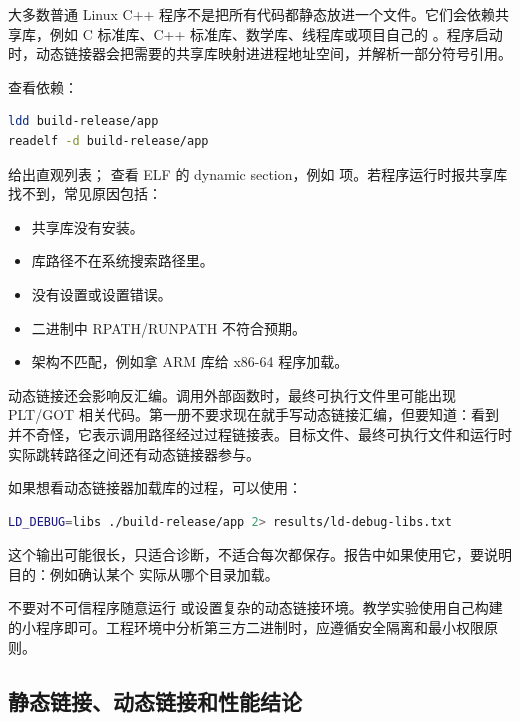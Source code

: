 大多数普通 Linux C++ 程序不是把所有代码都静态放进一个文件。它们会依赖共享库，例如 C 标准库、C++ 标准库、数学库、线程库或项目自己的 。程序启动时，动态链接器会把需要的共享库映射进进程地址空间，并解析一部分符号引用。

查看依赖：

\begin{lstlisting}[language=bash]
ldd build-release/app
readelf -d build-release/app
\end{lstlisting}

 给出直观列表； 查看 ELF 的 dynamic section，例如  项。若程序运行时报共享库找不到，常见原因包括：

\begin{itemize}
  \item 共享库没有安装。
  \item 库路径不在系统搜索路径里。
  \item {} 没有设置或设置错误。
  \item 二进制中 RPATH/RUNPATH 不符合预期。
  \item 架构不匹配，例如拿 ARM 库给 x86-64 程序加载。
\end{itemize}

动态链接还会影响反汇编。调用外部函数时，最终可执行文件里可能出现 PLT/GOT 相关代码。第一册不要求现在就手写动态链接汇编，但要知道：看到  并不奇怪，它表示调用路径经过过程链接表。目标文件、最终可执行文件和运行时实际跳转路径之间还有动态链接器参与。

如果想看动态链接器加载库的过程，可以使用：

\begin{lstlisting}[language=bash]
LD_DEBUG=libs ./build-release/app 2> results/ld-debug-libs.txt
\end{lstlisting}

这个输出可能很长，只适合诊断，不适合每次都保存。报告中如果使用它，要说明目的：例如确认某个  实际从哪个目录加载。

\begin{warningbox}
不要对不可信程序随意运行  或设置复杂的动态链接环境。教学实验使用自己构建的小程序即可。工程环境中分析第三方二进制时，应遵循安全隔离和最小权限原则。
\end{warningbox}

\subsection{静态链接、动态链接和性能结论}

